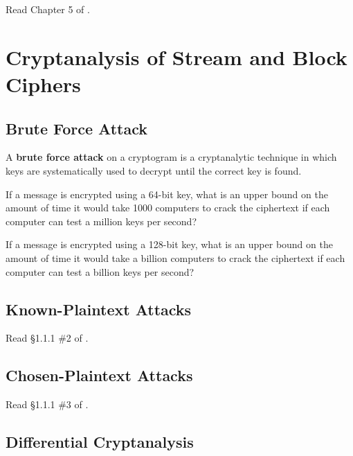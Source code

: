 		Read Chapter 5 of \cite{tw}.



	\section{Cryptanalysis of Stream and Block Ciphers}

		\subsection{Brute Force Attack}

                \begin{definition}
                  A {\bf brute force attack} on a cryptogram is a cryptanalytic technique in which keys are systematically used to decrypt until the correct key is found.
                \end{definition}

                \begin{problem} [10 points]
                  If a message is encrypted using a 64-bit key, what is an upper bound on the amount of time it would take 1000 computers to crack the ciphertext if each computer can test a million keys per second?
                \end{problem}

                \begin{problem} [10 points]
                  If a message is encrypted using a 128-bit key, what is an upper bound on the amount of time it would take a billion computers to crack the ciphertext if each computer can test a billion keys per second?
                \end{problem}

		\subsection{Known-Plaintext Attacks}

		Read \S 1.1.1 \#2 of \cite{tw}.

		\subsection{Chosen-Plaintext Attacks}

		Read \S 1.1.1 \#3 of \cite{tw}.

		\subsection{Differential Cryptanalysis}


